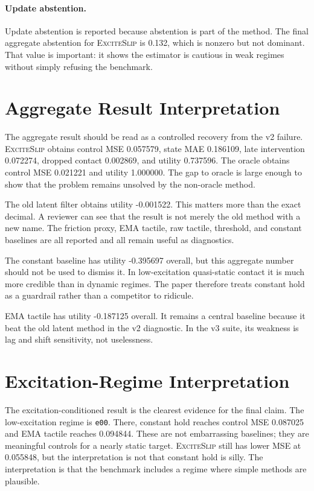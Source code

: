 \documentclass{article}
\newcommand{\method}{\textsc{ExciteSlip}\xspace}
\begin{document}
\paragraph{Update abstention.}
Update abstention is reported because abstention is part of the method. The final aggregate abstention for \method is 0.132, which is nonzero but not dominant. That value is important: it shows the estimator is cautious in weak regimes without simply refusing the benchmark.

\section{Aggregate Result Interpretation}

The aggregate result should be read as a controlled recovery from the v2 failure. \method obtains control MSE 0.057579, state MAE 0.186109, late intervention 0.072274, dropped contact 0.002869, and utility 0.737596. The oracle obtains control MSE 0.021221 and utility 1.000000. The gap to oracle is large enough to show that the problem remains unsolved by the non-oracle method.

The old latent filter obtains utility -0.001522. This matters more than the exact decimal. A reviewer can see that the result is not merely the old method with a new name. The friction proxy, EMA tactile, raw tactile, threshold, and constant baselines are all reported and all remain useful as diagnostics.

The constant baseline has utility -0.395697 overall, but this aggregate number should not be used to dismiss it. In low-excitation quasi-static contact it is much more credible than in dynamic regimes. The paper therefore treats constant hold as a guardrail rather than a competitor to ridicule.

EMA tactile has utility -0.187125 overall. It remains a central baseline because it beat the old latent method in the v2 diagnostic. In the v3 suite, its weakness is lag and shift sensitivity, not uselessness.

\section{Excitation-Regime Interpretation}

The excitation-conditioned result is the clearest evidence for the final claim. The low-excitation regime is \texttt{e00}. There, constant hold reaches control MSE 0.087025 and EMA tactile reaches 0.094844. These are not embarrassing baselines; they are meaningful controls for a nearly static target. \method still has lower MSE at 0.055848, but the interpretation is not that constant hold is silly. The interpretation is that the benchmark includes a regime where simple methods are plausible.
\end{document}
